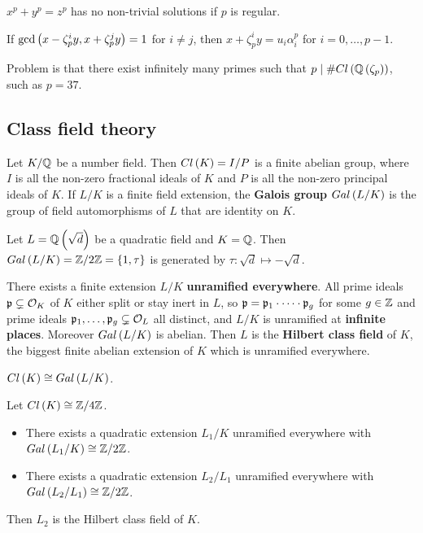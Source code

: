 \begin{theorem}[Kummer]
$ x^p + y^p = z^p $ has no non-trivial solutions if $ p $ is regular.
\end{theorem}

\begin{example*}
If $ \gcd\left( x - \zeta_p^iy, x + \zeta_p^jy \right) = 1 $ for $ i \ne j $, then $ x + \zeta_p^iy = u_i\alpha_i^p $ for $ i = 0, \dots, p - 1 $.
\end{example*}

Problem is that there exist infinitely many primes such that $ p \mid \#Cl\left( \mathbb{Q}\left( \zeta_p \right) \right) $, such as $ p = 37 $.

\subsection{Class field theory}

Let $ K / \mathbb{Q} $ be a number field. Then $ Cl\left( K \right) = I / P $ is a finite abelian group, where $ I $ is all the non-zero fractional ideals of $ K $ and $ P $ is all the non-zero principal ideals of $ K $. If $ L / K $ is a finite field extension, the \textbf{Galois group} $ Gal\left( L / K \right) $ is the group of field automorphisms of $ L $ that are identity on $ K $.

\begin{example*}
Let $ L = \mathbb{Q}\left( \sqrt{d} \right) $ be a quadratic field and $ K = \mathbb{Q} $. Then $ Gal\left( L / K \right) = \mathbb{Z} / 2\mathbb{Z} = \left\{ 1, \tau \right\} $ is generated by $ \tau : \sqrt{d} \mapsto -\sqrt{d} $.
\end{example*}

There exists a finite extension $ L / K $ \textbf{unramified everywhere}. All prime ideals $ \mathfrak{p} \subsetneq \mathcal{O}_K $ of $ K $ either split or stay inert in $ L $, so $ \mathfrak{p} = \mathfrak{p}_1 \cdot \dots \cdot \mathfrak{p}_g $ for some $ g \in \mathbb{Z} $ and prime ideals $ \mathfrak{p}_1, \dots, \mathfrak{p}_g \subsetneq \mathcal{O}_L $ all distinct, and $ L / K $ is unramified at \textbf{infinite places}. Moreover $ Gal\left( L / K \right) $ is abelian. Then $ L $ is the \textbf{Hilbert class field} of $ K $, the biggest finite abelian extension of $ K $ which is unramified everywhere.

\begin{theorem}
$ Cl\left( K \right) \cong Gal\left( L / K \right) $.
\end{theorem}

\begin{example*}
Let $ Cl\left( K \right) \cong \mathbb{Z} / 4\mathbb{Z} $.
\begin{itemize}
\item There exists a quadratic extension $ L_1 / K $ unramified everywhere with $ Gal\left( L_1 / K \right) \cong \mathbb{Z} / 2\mathbb{Z} $.
\item There exists a quadratic extension $ L_2 / L_1 $ unramified everywhere with $ Gal\left( L_2 / L_1 \right) \cong \mathbb{Z} / 2\mathbb{Z} $.
\end{itemize}
Then $ L_2 $ is the Hilbert class field of $ K $.
\end{example*}

